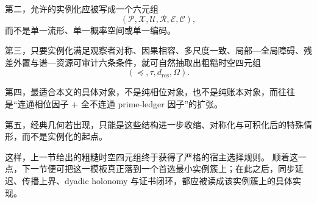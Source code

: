 第二，允许的实例化应被写成一个六元组
\[
(\mathcal P,\mathcal X,\mathcal U,\mathcal R,\mathcal E,\mathcal C),
\]
而不是单一流形、单一概率空间或单一编码。

第三，只要实例化满足观察者对称、因果相容、多尺度一致、局部—全局障碍、残差外置与谱—资源可审计六条条件，就可自然抽取出粗糙时空四元组
\[
(\preceq,\tau,d_{\mathrm{res}},\Omega).
\]

第四，最适合本文的具体对象，不是纯相位对象，也不是纯账本对象，而往往是“连通相位因子 + 全不连通 prime-ledger 因子”的扩张。

第五，经典几何若出现，只能是这些结构进一步收缩、对称化与可积化后的特殊情形，而不是实例化的起点。

这样，上一节给出的粗糙时空四元组终于获得了严格的宿主选择规则。
顺着这一点，下一节便可把这一模板真正落到一个首选最小实例簇上；在此之后，同步延迟、传播上界、dyadic holonomy 与证书闭环，都应被读成该实例簇上的具体实现。
